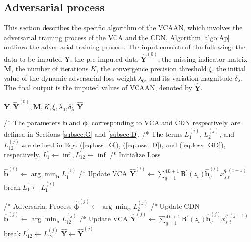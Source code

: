 \documentclass[3p,11pt,authoryear]{elsarticle}
\begin{document}
\subsection{Adversarial process}\label{subsec:Ap}
This section describes the specific algorithm of the VCAAN, which involves the adversarial training process of the VCA and the CDN. Algorithm \ref{algo:Ap} outlines the adversarial training process. The input consists of the following: the data to be imputed $\mathbf{Y}$, the pre-imputed data $\widehat{\mathbf{Y}}^{(0)}$, the missing indicator matrix $\mathbf{M}$, the number of iterations $K$, the convergence precision threshold $\xi$, the initial value of the dynamic adversarial loss weight $\lambda_0$, and its variation magnitude $\delta_\lambda$. The final output is the imputed values of VCAAN, denoted by $\widehat{\mathbf{Y}}$. 

\begin{algorithm}[t]
	\caption{Adversarial Process}\label{algo:Ap}
	\begin{algorithmic}[1]
		\REQUIRE $\mathbf{Y}, \widehat{\mathbf{Y}}^{(0)}, \mathbf{M}, K, \xi, \lambda_0,  \delta_\lambda$
		\ENSURE $\widehat{\mathbf{Y}}$
		
		\STATE /* The parameters $\boldsymbol{b}$ and $\boldsymbol{\phi}$, corresponding to VCA and CDN respectively, are defined in Sections \ref{subsec:G} and \ref{subsec:D}. 
		\STATE /* The terms $L_1^{(i)}$, $L_2^{(j)}$, and $L_{12}^{(j)}$ are defined in Eqs. (\ref{eq:loss_G}), (\ref{eq:loss_D}), and (\ref{eq:loss_GD}), respectively. 
		\STATE $L_1^{\prime} \gets \inf, L_{12}^{\prime} \gets \inf $ \hfill /* Initialize Loss
		
		\STATE $\hat{\boldsymbol{b}}^{(i)} \gets \arg\min_{\boldsymbol{b}} L_1^{(i)}$ \hfill /* Update VCA 
		\STATE $\widehat{\mathbf{Y}}^{(i)} \gets \sum_{q=1}^{4L+1} \boldsymbol{B}^{\prime}(z_t) \hat{\boldsymbol{b}}^{(i)}_q x_{s,t}^{q, (i-1)}$
		\STATE break
		\ENDIF
		\STATE $L_1^{\prime} \gets L_1^{(i)} $
		\ENDFOR
		
		\STATE /* Adversarial Process 
		\STATE $\hat{\boldsymbol{\phi}}^{(j)} \gets \arg\min_{\boldsymbol{\phi}} L_2^{(j)}$ \hfill /* Update CDN 
		\STATE $\hat{\boldsymbol{b}}^{(j)} \gets \arg\min_{\boldsymbol{b}} L_{12}^{(j)}$ \hfill /* Update VCA 
		\STATE $\widehat{\mathbf{Y}}^{(j)} \gets \sum_{q=1}^{4L+1} \boldsymbol{B}^{\prime}(z_t) \hat{\boldsymbol{b}}^{(j)}_q x_{s,t}^{q, (j-1)}$
		\STATE break
		\ENDIF
		\STATE $L_{12}^{\prime} \gets L_{12}^{(j)} $
		\ENDFOR
		\RETURN $\widehat{\mathbf{Y}} \gets \widehat{\mathbf{Y}}^{(j)}$
	\end{algorithmic}
\end{algorithm}
\end{document}
